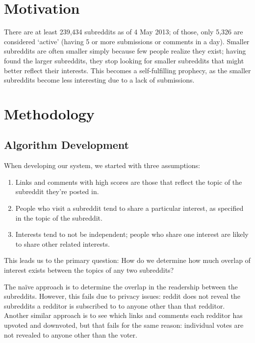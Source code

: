 \documentclass[journal, draftclsnofoot]{./styles/IEEEtran}
\begin{document}
\section{Motivation}

There are at least 239,434 subreddits as of 4 May 2013\cite{metareddit};
of those, only 5,326 are considered `active' (having 5 or more
submissions or comments in a day)\cite{reddit-aboutreddit}. Smaller
subreddits are often smaller simply because few people realize they
exist; having found the larger subreddits, they stop looking for smaller
subreddits that might better reflect their interests. This becomes a
self-fulfilling prophecy, as the smaller subreddits become less
interesting due to a lack of submissions.

\section{Methodology}

\subsection{Algorithm Development}

When developing our system, we started with three assumptions:

\begin{enumerate}

\item Links and comments with high scores are those that reflect the
topic of the subreddit they're posted in.

\item People who visit a subreddit tend to share a particular interest,
as specified in the topic of the subreddit.

\item Interests tend to not be independent; people who share one
interest are likely to share other related interests.

\end{enumerate}

This leads us to the primary question: How do we determine how much
overlap of interest exists between the topics of any two subreddits?

The na\"i{}ve approach is to determine the overlap in the readership
between the subreddits. However, this fails due to privacy issues:
reddit does not reveal the subreddits a redditor is subscribed to to
anyone other than that redditor. Another similar approach is to see
which links and comments each redditor has upvoted and downvoted, but
that fails for the same reason: individual votes are not revealed to
anyone other than the voter.
\end{document}
